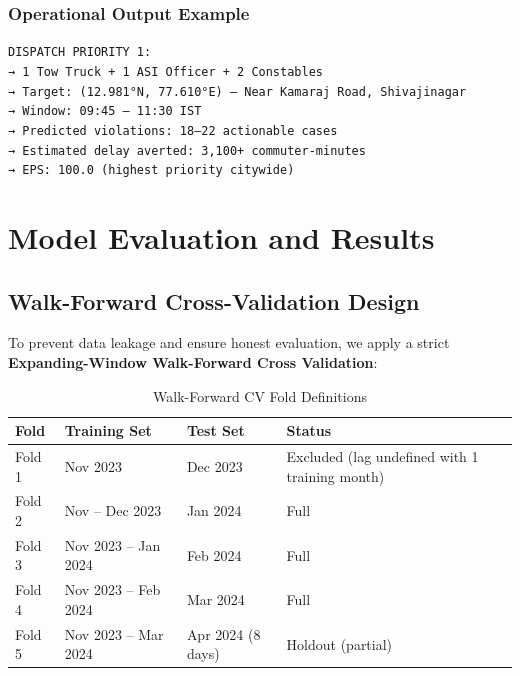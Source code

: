 \documentclass[12pt,a4paper]{article}
\begin{document}
\subsubsection{Operational Output Example}

\begin{tcolorbox}[resultbox, title={Sample Dispatch Recommendation (Morning Peak)}]
\texttt{DISPATCH PRIORITY 1:}\\
\texttt{→ 1 Tow Truck + 1 ASI Officer + 2 Constables}\\
\texttt{→ Target: (12.981°N, 77.610°E) — Near Kamaraj Road, Shivajinagar}\\
\texttt{→ Window: 09:45 -- 11:30 IST}\\
\texttt{→ Predicted violations: 18--22 actionable cases}\\
\texttt{→ Estimated delay averted: 3,100+ commuter-minutes}\\
\texttt{→ EPS: 100.0 (highest priority citywide)}
\end{tcolorbox}

\section{Model Evaluation and Results}

\subsection{Walk-Forward Cross-Validation Design}

To prevent data leakage and ensure honest evaluation, we apply a strict \textbf{Expanding-Window Walk-Forward Cross Validation}:

\begin{table}[H]
\centering
\caption{Walk-Forward CV Fold Definitions}
\begin{tabular}{llll}
\toprule
\textbf{Fold} & \textbf{Training Set} & \textbf{Test Set} & \textbf{Status} \\
\midrule
Fold 1 & Nov 2023 & Dec 2023 & Excluded (lag undefined with 1 training month) \\
Fold 2 & Nov -- Dec 2023 & Jan 2024 & Full \\
Fold 3 & Nov 2023 -- Jan 2024 & Feb 2024 & Full \\
Fold 4 & Nov 2023 -- Feb 2024 & Mar 2024 & Full \\
Fold 5 & Nov 2023 -- Mar 2024 & Apr 2024 (8 days) & Holdout (partial) \\
\bottomrule
\end{tabular}
\end{table}
\end{document}
